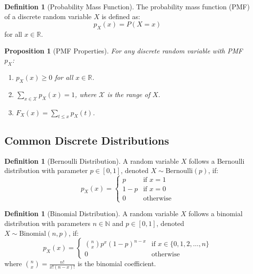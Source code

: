 \documentclass[12pt,a4paper]{article}
\theoremstyle{plain}
\newtheorem{proposition}[theorem]{Proposition}
\theoremstyle{definition}
\newtheorem{definition}[theorem]{Definition}
\begin{document}
\begin{definition}[Probability Mass Function]
The probability mass function (PMF) of a discrete random variable $X$ is defined as:
\begin{equation}
p_X(x) = P(X = x)
\end{equation}
for all $x \in \mathbb{R}$.
\end{definition}

\begin{proposition}[PMF Properties]
For any discrete random variable with PMF $p_X$:
\begin{enumerate}[label=(\roman*)]
\item $p_X(x) \geq 0$ for all $x \in \mathbb{R}$.
\item $\sum_{x \in \mathcal{X}} p_X(x) = 1$, where $\mathcal{X}$ is the range of $X$.
\item $F_X(x) = \sum_{t \leq x} p_X(t)$.
\end{enumerate}
\end{proposition}

\subsection{Common Discrete Distributions}

\begin{definition}[Bernoulli Distribution]
A random variable $X$ follows a Bernoulli distribution with parameter $p \in [0,1]$, denoted $X \sim \text{Bernoulli}(p)$, if:
\begin{equation}
p_X(x) = 
\begin{cases}
p & \text{if } x = 1 \\
1-p & \text{if } x = 0 \\
0 & \text{otherwise}
\end{cases}
\end{equation}
\end{definition}

\begin{definition}[Binomial Distribution]
A random variable $X$ follows a binomial distribution with parameters $n \in \mathbb{N}$ and $p \in [0,1]$, denoted $X \sim \text{Binomial}(n,p)$, if:
\begin{equation}
p_X(x) = 
\begin{cases}
\binom{n}{x} p^x (1-p)^{n-x} & \text{if } x \in \{0,1,2,\ldots,n\} \\
0 & \text{otherwise}
\end{cases}
\end{equation}
where $\binom{n}{x} = \frac{n!}{x!(n-x)!}$ is the binomial coefficient.
\end{definition}
\end{document}
